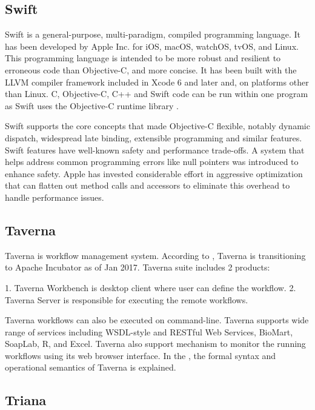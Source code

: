 \subsection{Swift}

   Swift is a general-purpose, multi-paradigm, compiled programming
   language. It has been developed by Apple Inc. for iOS, macOS,
   watchOS, tvOS, and Linux. This programming language is intended to
   be more robust and resilient to erroneous code than Objective-C,
   and more concise. It has been built with the LLVM compiler
   framework included in Xcode 6 and later and, on platforms other
   than Linux. C, Objective-C, C++ and Swift code can be run within
   one program as Swift uses the Objective-C runtime
   library \cite{www-swift-wikipedia}.

   Swift supports the core concepts that made Objective-C flexible,
   notably dynamic dispatch, widespread late binding, extensible
   programming and similar features. Swift features have well-known
   safety and performance trade-offs. A system that helps address
   common programming errors like null pointers was introduced to
   enhance safety. Apple has invested considerable effort in
   aggressive optimization that can flatten out method calls and
   accessors to eliminate this overhead to handle performance issues.
      
\subsection{Taverna}

   Taverna is workflow management system. According to
   \cite{www-taverna}, Taverna is transitioning to Apache Incubator
   as of Jan 2017.  Taverna suite includes 2 products:

   1. Taverna Workbench is desktop client where user can define the
      workflow.
   2. Taverna Server is responsible for executing the remote
      workflows.

   Taverna workflows can also be executed on command-line.  Taverna
   supports wide range of services including WSDL-style and RESTful
   Web Services, BioMart, SoapLab, R, and Excel. Taverna also support
   mechanism to monitor the running workflows using its web browser
   interface.  In the \cite{taverna-paper}, the formal syntax
   and operational semantics of Taverna is explained.

\subsection{Triana}

